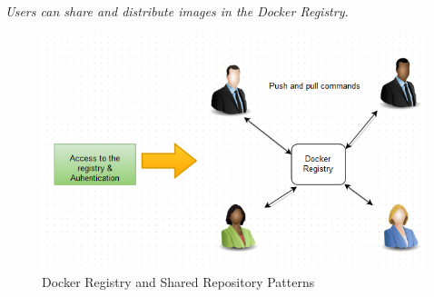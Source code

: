 \begin{description}
\textit{Users can share and distribute images in the Docker Registry.}
 \begin{figure}[H]
 \centering
 \includegraphics[scale=0.7]{5-patterns/images/SharedRepo.png}
 \caption{Docker Registry and Shared Repository Patterns}
 \label{fig:docker-registry}
 \end{figure}
 
\end{description}

